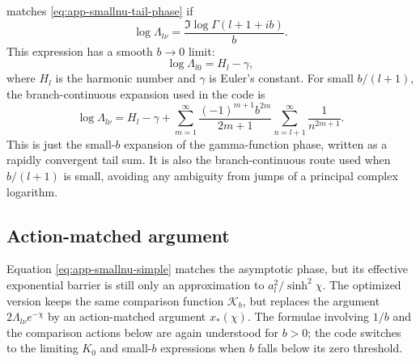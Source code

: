 \documentclass[11pt,a4paper]{article}
\begin{document}
matches \eqref{eq:app-smallnu-tail-phase} if
\begin{equation}
  \log\Lambda_{l\nu}
  =\frac{\Im\log\Gamma(l+1+i b)}{b}.
  \label{eq:app-smallnu-loglambda}
\end{equation}
This expression has a smooth \(b\to0\) limit:
\begin{equation}
  \log\Lambda_{l0}=H_l-\gamma,
\end{equation}
where \(H_l\) is the harmonic number and \(\gamma\) is Euler's constant.  For
small \(b/(l+1)\), the branch-continuous expansion used in the code is
\begin{equation}
  \log\Lambda_{l\nu}=
  H_l-\gamma+
  \sum_{m=1}^{\infty}
  \frac{(-1)^{m+1}b^{2m}}{2m+1}
  \sum_{n=l+1}^{\infty}\frac{1}{n^{2m+1}}.
  \label{eq:app-smallnu-loglambda-series}
\end{equation}
This is just the small-\(b\) expansion of the gamma-function phase, written as
a rapidly convergent tail sum.  It is also the branch-continuous route used
when \(b/(l+1)\) is small, avoiding any ambiguity from jumps of a principal
complex logarithm.

\subsection{Action-matched argument}

Equation \eqref{eq:app-smallnu-simple} matches the asymptotic phase, but its
effective exponential barrier is still only an approximation to
\(a_l^2/\sinh^2\chi\).  The optimized version keeps the same comparison
function \(\mathcal K_b\), but replaces the argument
\(2\Lambda_{l\nu}e^{-\chi}\) by an action-matched argument \(x_*(\chi)\).
The formulae involving \(1/b\) and the comparison actions below are again
understood for \(b>0\); the code switches to the limiting \(K_0\) and
small-\(b\) expressions when \(b\) falls below its zero threshold.
\end{document}
